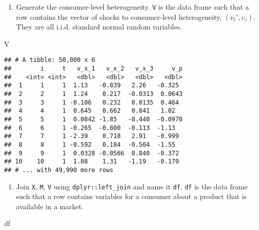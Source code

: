 \documentclass[
]{book}
\newenvironment{Shaded}{\begin{snugshade}}{\end{snugshade}}
\newcommand{\NormalTok}[1]{#1}
\providecommand{\tightlist}{%
  \setlength{\itemsep}{0pt}\setlength{\parskip}{0pt}}
\begin{document}
\begin{enumerate}
\def\labelenumi{\arabic{enumi}.}
\setcounter{enumi}{3}
\tightlist
\item
  Generate the consumer-level heterogeneity. \texttt{V} is the data frame such that a row contains the vector of shocks to consumer-level heterogeneity, \((\nu_{i}', \upsilon_i)\). They are all i.i.d. standard normal random variables.
\end{enumerate}

\begin{Shaded}
\begin{Highlighting}[]
\NormalTok{V}
\end{Highlighting}
\end{Shaded}

\begin{verbatim}
## # A tibble: 50,000 x 6
##        i     t   v_x_1   v_x_2   v_x_3     v_p
##    <int> <int>   <dbl>   <dbl>   <dbl>   <dbl>
##  1     1     1  1.13   -0.839   2.26   -0.325 
##  2     2     1  1.24    0.217  -0.0313  0.0643
##  3     3     1 -0.106   0.232   0.0135  0.464 
##  4     4     1  0.645   0.662   0.841   1.02  
##  5     5     1  0.0842 -1.85   -0.440  -0.0970
##  6     6     1 -0.265  -0.800  -0.113  -1.13  
##  7     7     1 -2.39    0.718   2.91   -0.999 
##  8     8     1 -0.592   0.184  -0.504  -1.55  
##  9     9     1  0.0328 -0.0566  0.840  -0.372 
## 10    10     1  1.08    1.31   -1.19   -0.179 
## # ... with 49,990 more rows
\end{verbatim}

\begin{enumerate}
\def\labelenumi{\arabic{enumi}.}
\setcounter{enumi}{4}
\tightlist
\item
  Join \texttt{X}, \texttt{M}, \texttt{V} using \texttt{dplyr::left\_join} and name it \texttt{df}. \texttt{df} is the data frame such that a row contains variables for a consumer about a product that is available in a market.
\end{enumerate}

\begin{Shaded}
\begin{Highlighting}[]
\NormalTok{df}
\end{Highlighting}
\end{Shaded}
\end{document}
